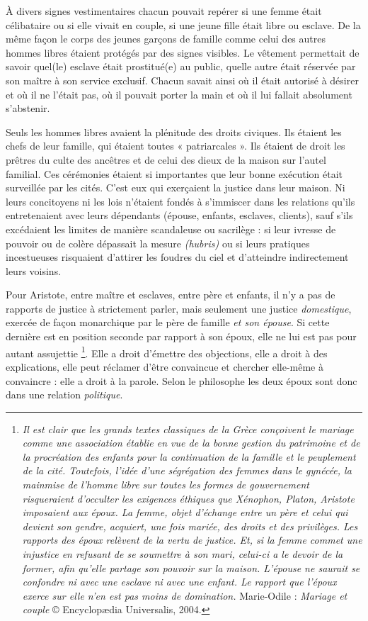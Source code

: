 À divers signes vestimentaires chacun pouvait repérer si une
femme était célibataire ou si elle vivait en couple, si une jeune fille était
libre ou esclave. De la même façon le corps des jeunes garçons de famille
comme celui des autres hommes libres étaient protégés par des signes visibles.
Le vêtement permettait de savoir quel(le) esclave était prostitué(e)
au public, quelle autre était réservée par son maître à son service exclusif.
Chacun savait ainsi où il était autorisé à désirer et où il ne l'était pas, où il
pouvait porter la main et où il lui fallait absolument s'abstenir.

Seuls les hommes libres avaient la plénitude des droits civiques. Ils
étaient les chefs de leur famille, qui étaient toutes « patriarcales ».
Ils étaient de droit les prêtres du culte des ancêtres et de celui des dieux
de la maison sur l'autel familial. Ces cérémonies étaient si importantes
que leur bonne exécution était surveillée par les cités. C'est eux qui exerçaient
la justice dans leur maison. Ni leurs concitoyens ni les lois
n'étaient fondés à s'immiscer dans les relations qu'ils entretenaient avec
leurs dépendants (épouse, enfants, esclaves, clients), sauf s'ils excédaient
les limites de manière scandaleuse ou sacrilège : si leur ivresse de pouvoir
ou de colère dépassait la mesure \emph{(hubris)} ou si leurs pratiques incestueuses
risquaient d'attirer les foudres du ciel et d'atteindre indirectement leurs
voisins.

Pour Aristote, entre maître et esclaves, entre père et enfants, il n'y
a pas de rapports de justice à strictement parler, mais seulement une
justice \emph{domestique}, exercée de façon monarchique par le père de famille \emph{et
son épouse}. Si cette dernière est en position seconde par rapport à son
époux, elle ne lui est pas pour autant assujettie%
\footnote{{\emph{Il est clair que les grands textes classiques de la Grèce conçoivent le mariage comme une association établie en vue de la bonne gestion du patrimoine et de la procréation des enfants pour la continuation de la famille et le peuplement de la cité. Toutefois, l'idée d'une ségrégation des femmes dans le gynécée, la mainmise de l'homme libre sur toutes les formes de gouvernement risqueraient d'occulter les exigences éthiques que Xénophon, Platon, Aristote imposaient aux époux. La femme, objet d'échange entre un père et celui qui devient son gendre, acquiert, une fois mariée, des droits et des privilèges. Les rapports des époux relèvent de la vertu de justice. Et, si la femme commet une injustice en refusant de se soumettre à son mari, celui-ci a le devoir de la former, afin qu'elle partage son pouvoir sur la maison. L'épouse ne saurait se confondre ni avec une esclave ni avec une enfant. Le rapport que l'époux exerce sur elle n'en est pas moins de domination.}}
Marie-Odile  : \emph{Mariage et couple} © Encyclopædia Universalis, 2004.}.
Elle a droit
d'émettre des objections, elle a droit à des explications, elle peut
réclamer d'être convaincue et chercher elle-même à convaincre : elle a
droit à la parole. Selon le philosophe les deux époux sont donc dans
une relation \emph{politique}. 

